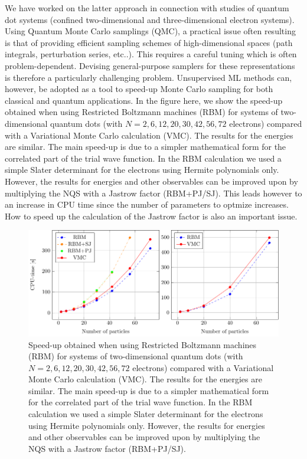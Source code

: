 \documentclass[%
oneside,                 %
final,                   %
10pt]{article}
\begin{document}
We have worked on the latter approach in connection with studies of
quantum dot systems (confined two-dimensional and three-dimensional
electron systems).  Using Quantum Monte Carlo samplings (QMC), a
practical issue often resulting is that of providing efficient
sampling schemes of high-dimensional spaces (path integrals,
perturbation series, etc..). This requires a careful tuning which is often
problem-dependent.  Devising general-purpose samplers for these
representations is therefore a particularly challenging
problem. Unsupervised ML methods can, however, be adopted as a tool to
speed-up Monte Carlo sampling for both classical and quantum
applications. In the figure here, we show the speed-up obtained when
using Restricted Boltzmann machines (RBM) for systems of
two-dimensional quantum dots (with $N=2,6,12,20,30,42,56,72$
electrons) compared with a Variational Monte Carlo calculation
(VMC). The results for the energies are similar. The main speed-up is
due to a simpler mathematical form for the correlated part of the
trial wave function. In the RBM calculation we used a simple Slater
determinant for the electrons using Hermite polynomials only. However,
the results for energies and other observables can be improved upon by
multiplying the NQS with a Jastrow factor (RBM+PJ/SJ). This leads
however to an increase in CPU time  since the number of parameters to optmize
increases. How to speed up the calculation of the Jastrow factor is
also an important issue.
\begin{figure}[hbtp]
        \centering
        \includegraphics[scale=0.5]{figures/quantumdots.pdf}
        \caption{Speed-up obtained when
using Restricted Boltzmann machines (RBM) for systems of
two-dimensional quantum dots (with $N=2,6,12,20,30,42,56,72$
electrons) compared with a Variational Monte Carlo calculation
(VMC). The results for the energies are similar. The main speed-up is
due to a simpler mathematical form for the correlated part of the
trial wave function. In the RBM calculation we used a simple Slater
determinant for the electrons using Hermite polynomials only. However,
the results for energies and other observables can be improved upon by
multiplying the NQS with a Jastrow factor (RBM+PJ/SJ).}
\end{figure}
\end{document}
